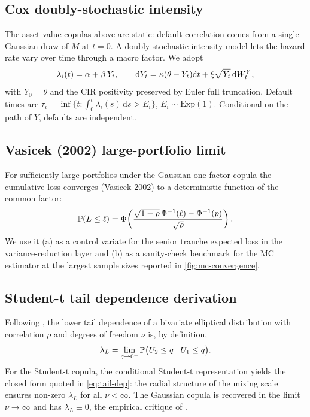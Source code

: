 \subsection{Cox doubly-stochastic intensity}\label{ssec:cox}

The asset-value copulas above are static: default correlation comes
from a single Gaussian draw of $M$ at $t = 0$. A doubly-stochastic
intensity model lets the hazard rate vary over time through a macro
factor. We adopt
\begin{equation}
\lambda_i(t) = \alpha + \beta\, Y_t, \qquad
\mathrm{d}Y_t = \kappa (\theta - Y_t) \mathrm{d}t + \xi \sqrt{Y_t}\, \mathrm{d}W^Y_t,
\label{eq:cox}
\end{equation}
with $Y_0 = \theta$ and the CIR positivity preserved by Euler full
truncation. Default times are $\tau_i = \inf\{t : \int_0^t \lambda_i(s)\,
\mathrm{d}s > E_i\}$, $E_i \sim \text{Exp}(1)$. Conditional on the path of
$Y$, defaults are independent.

\subsection{Vasicek (2002) large-portfolio limit}\label{ssec:vasicek-lpf}

For sufficiently large portfolios under the Gaussian one-factor copula
the cumulative loss converges (Vasicek 2002) to a deterministic function
of the common factor:
\begin{equation}
\mathbb{P}(L \le \ell) =
\Phi\!\left(\frac{\sqrt{1 - \rho}\,\Phi^{-1}(\ell) - \Phi^{-1}(p)}{\sqrt{\rho}}\right).
\label{eq:vasicek-lpf}
\end{equation}
We use it (a) as a control variate for the senior tranche expected loss
in the variance-reduction layer and (b) as a sanity-check benchmark for
the MC estimator at the largest sample sizes reported in
\cref{fig:mc-convergence}.

\subsection{Student-t tail dependence derivation}\label{ssec:t-dep-derivation}

Following \autocite{EmbrechtsMcNeilStraumann2002}, the lower tail
dependence of a bivariate elliptical distribution with correlation $\rho$
and degrees of freedom $\nu$ is, by definition,
\begin{equation*}
\lambda_L = \lim_{q \to 0^+}\mathbb{P}\bigl(U_2 \le q \mid U_1 \le q\bigr).
\end{equation*}
For the Student-t copula, the conditional Student-t representation
yields the closed form quoted in \cref{eq:tail-dep}: the radial structure
of the mixing scale ensures non-zero $\lambda_L$ for all $\nu < \infty$.
The Gaussian copula is recovered in the limit $\nu \to \infty$ and has
$\lambda_L \equiv 0$, the empirical critique of
\autocite{DonnellyEmbrechts2010}.

